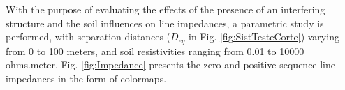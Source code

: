 \documentclass[conference]{IEEEtran}
\begin{document}
	
	
	
	With the purpose of evaluating the effects of the presence of an interfering structure and the soil influences on line impedances, a parametric study is performed, with separation distances ($D_{eq}$ in Fig. \ref{fig:SistTesteCorte}) varying from 0 to 100 meters, and soil resistivities ranging from 0.01 to 10000 ohms.meter. Fig. \ref{fig:Impedance} presents the zero and positive sequence line impedances in the form of colormaps.
	
\end{document}
